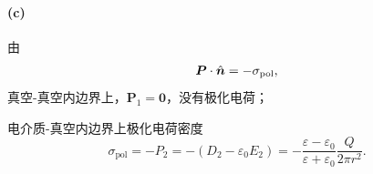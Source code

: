 \paragraph{(c)}
由
\begin{equation}
    \bm P\cdot\mathop{}\!\hat{\bm n}=-\sigma_\text{pol},
\end{equation}
真空-真空内边界上，$\bm P_1=\bm 0$，没有极化电荷；

电介质-真空内边界上极化电荷密度
\begin{equation}
    \sigma_\text{pol}=-P_2=-(D_2-\varepsilon_0E_2)=-\frac{\varepsilon-\varepsilon_0}{\varepsilon+\varepsilon_0}\frac Q{2\pi r^2}.
\end{equation}
